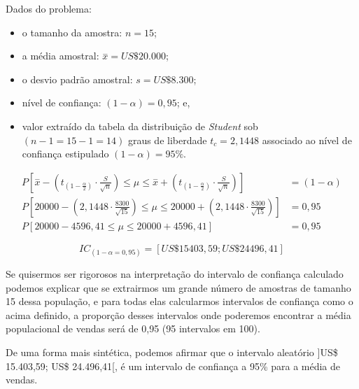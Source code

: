 \documentclass[
]{book}
\providecommand{\tightlist}{%
  \setlength{\itemsep}{0pt}\setlength{\parskip}{0pt}}
\begin{document}
\hfill\break

Dados do problema:

\hfill\break

\begin{itemize}
\tightlist
\item
  o tamanho da amostra: \(n=15\);\\
\item
  a média amostral: \(\stackrel{-}{x}=US\$ 20.000\);\\
\item
  o desvio padrão amostral: \(s=US\$ 8.300\);\\
\item
  nível de confiança: \((1-\alpha)=0,95\); e,
\item
  valor extraído da tabela da distribuição de \textit{Student} sob \((n-1=15-1=14)\) graus de liberdade \(t_{c}=2,1448\) associado ao nível de confiança estipulado \((1-\alpha)=95\%\).
\end{itemize}

\hfill\break

\begin{align*}
P[\stackrel{-}{x}-({t}_{(1-\frac{\alpha }{2})} \cdot \frac{S}{\sqrt{n}}) \le \mu \le \stackrel{-}{x}+({t}_{(1-\frac{\alpha }{2})} \cdot \frac{S}{\sqrt{n}}) ] & = (1-\alpha) \\
P[20000 - ( 2,1448 \cdot \frac{8300}{\sqrt{15}}) \le \mu \le 20000 + ( 2,1448  \cdot \frac{8300}{\sqrt{15}}) ] & = 0,95\\
P[20000 - 4596,41 \le \mu \le 20000 + 4596,41 ] & = 0,95
\end{align*}

\hfill\break

\[
IC_{(1-\alpha=0,95)} = [US\$ 15403,59 ; US\$ 24496,41]
\]

\hfill\break

Se quisermos ser rigorosos na interpretação do intervalo de confiança calculado podemos explicar que se extrairmos um grande número de amostras de tamanho 15 dessa população, e para todas elas calcularmos intervalos de confiança como o acima definido, a proporção desses intervalos onde poderemos encontrar a média populacional de vendas será de 0,95 (95 intervalos em 100).

\hfill\break

De uma forma mais sintética, podemos afirmar que o intervalo aleatório {]}US\$ 15.403,59; US\$ 24.496,41{[}, é um intervalo de confiança a 95\% para a média de vendas.

\hfill\break
\end{document}
